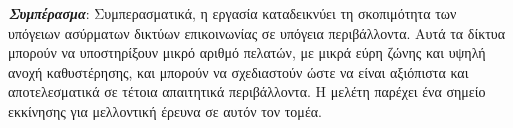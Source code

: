 \documentclass[12pt]{article}
\begin{document}
\begin{multicols}{2}
    \textit{\textbf{Συμπέρασμα}}: Συμπερασματικά, η εργασία καταδεικνύει τη σκοπιμότητα των υπόγειων ασύρματων δικτύων επικοινωνίας σε υπόγεια περιβάλλοντα. Αυτά τα δίκτυα μπορούν να υποστηρίξουν μικρό αριθμό πελατών, με μικρά εύρη ζώνης και υψηλή ανοχή καθυστέρησης, και μπορούν να σχεδιαστούν ώστε να είναι αξιόπιστα και αποτελεσματικά σε τέτοια απαιτητικά περιβάλλοντα. Η μελέτη παρέχει ένα σημείο εκκίνησης για μελλοντική έρευνα σε αυτόν τον τομέα.
\end{multicols}
\end{document}
